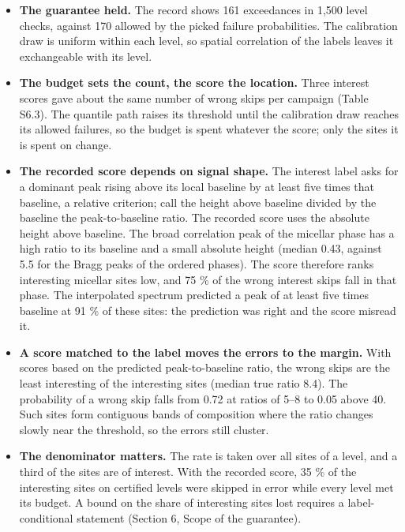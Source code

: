 \documentclass{iopjournal}
\providecommand{\tightlist}{\setlength{\itemsep}{0pt}\setlength{\parskip}{0pt}}
\begin{document}
\begin{itemize}
\tightlist
\item
  \textbf{The guarantee held.} The record shows 161 exceedances in 1,500 level checks, against 170 allowed by the picked failure probabilities. The calibration draw is uniform within each level, so spatial correlation of the labels leaves it exchangeable with its level.
\item
  \textbf{The budget sets the count, the score the location.} Three interest scores gave about the same number of wrong skips per campaign (Table S6.3). The quantile path raises its threshold until the calibration draw reaches its allowed failures, so the budget is spent whatever the score; only the sites it is spent on change.
\item
  \textbf{The recorded score depends on signal shape.} The interest label asks for a dominant peak rising above its local baseline by at least five times that baseline, a relative criterion; call the height above baseline divided by the baseline the peak-to-baseline ratio. The recorded score uses the absolute height above baseline. The broad correlation peak of the micellar phase has a high ratio to its baseline and a small absolute height (median 0.43, against 5.5 for the Bragg peaks of the ordered phases). The score therefore ranks interesting micellar sites low, and 75 \% of the wrong interest skips fall in that phase. The interpolated spectrum predicted a peak of at least five times baseline at 91 \% of these sites: the prediction was right and the score misread it.
\item
  \textbf{A score matched to the label moves the errors to the margin.} With scores based on the predicted peak-to-baseline ratio, the wrong skips are the least interesting of the interesting sites (median true ratio 8.4). The probability of a wrong skip falls from 0.72 at ratios of 5--8 to 0.05 above 40. Such sites form contiguous bands of composition where the ratio changes slowly near the threshold, so the errors still cluster.
\item
  \textbf{The denominator matters.} The rate is taken over all sites of a level, and a third of the sites are of interest. With the recorded score, 35 \% of the interesting sites on certified levels were skipped in error while every level met its budget. A bound on the share of interesting sites lost requires a label-conditional statement (Section 6, Scope of the guarantee).
\end{itemize}
\end{document}
